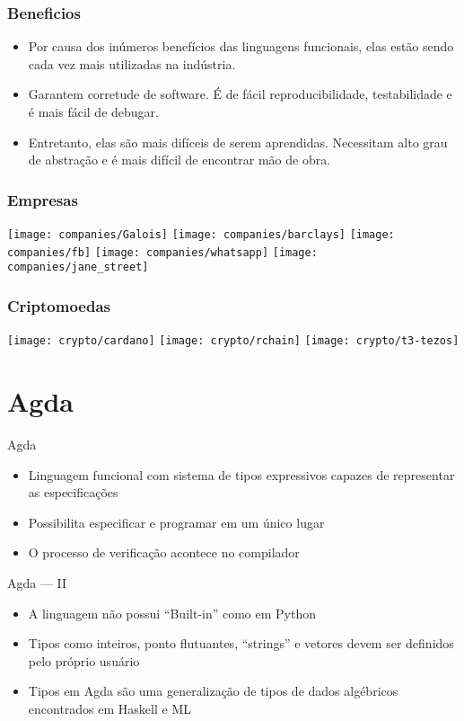 \documentclass{beamer}
\begin{document}
\begin{frame}
  \frametitle{Beneficios}
  \begin{itemize}
    \item Por causa dos inúmeros benefícios das linguagens funcionais,
      elas estão sendo cada vez mais utilizadas na indústria.
    \item Garantem corretude de software.
      É de fácil reproducibilidade, testabilidade e é mais fácil de debugar.
    \item Entretanto, elas são mais difíceis de serem aprendidas.
      Necessitam alto grau de abstração e
      é mais difícil de encontrar mão de obra.
  \end{itemize}
\end{frame}

\begin{frame}
  \frametitle{Empresas}
    \texttt{[image: companies/Galois]}
    \texttt{[image: companies/barclays]}
    \texttt{[image: companies/fb]}
    \texttt{[image: companies/whatsapp]}
    \texttt{[image: companies/jane\_street]}
\end{frame}

\begin{frame}
  \frametitle{Criptomoedas}
    \texttt{[image: crypto/cardano]}
    \texttt{[image: crypto/rchain]}
    \texttt{[image: crypto/t3-tezos]}
\end{frame}
 
\section{Agda}

 \begin{frame}{Agda}
 \begin{itemize}
   \item Linguagem funcional com sistema de tipos expressivos capazes de representar as especificações
     \item Possibilita especificar e programar em um único lugar
     \item O processo de verificação acontece no compilador
 \end{itemize}
 \end{frame}
 
 \begin{frame}{Agda --- II}
 \begin{itemize}
     \item A linguagem não possui \foreignquote{english}{Built-in} como em Python
     \item Tipos como inteiros, ponto flutuantes, \foreignquote{english}{strings} e vetores devem ser definidos pelo próprio usuário
     \item Tipos em Agda são uma generalização de tipos de dados algébricos encontrados em Haskell e ML
 \end{itemize}
 \end{frame}
\end{document}
